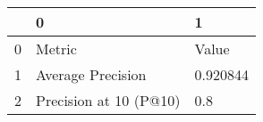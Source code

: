 \begin{tabular}{lll}
\toprule
{} &                       0 &         1 \\
\midrule
0 &                  Metric &     Value \\
1 &       Average Precision &  0.920844 \\
2 &  Precision at 10 (P@10) &       0.8 \\
\bottomrule
\end{tabular}
